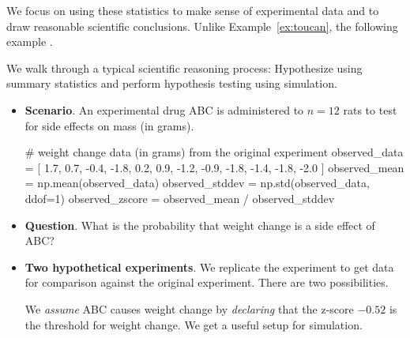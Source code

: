 \documentclass[../main.tex]{subfiles}
\begin{document}
\clearpage
We focus on using these statistics to make sense of experimental data and to draw reasonable scientific conclusions.  Unlike Example~\ref{ex:toucan}, the following example .

\begin{example} \label{ex:simulation}
  We walk through a typical scientific reasoning process: Hypothesize using summary statistics and perform hypothesis testing using simulation.

  \begin{itemize}[wide]
    \item \textbf{Scenario}. An experimental drug ABC is administered to \(n = 12\) rats to test for side effects on  mass (in grams).

      \begin{pythoncode}
# weight change data (in grams) from the original experiment
observed_data   = [
  1.7, 0.7, -0.4, -1.8, 0.2, 0.9, -1.2, -0.9, -1.8, -1.4, -1.8, -2.0
]
observed_mean   = np.mean(observed_data)
observed_stddev = np.std(observed_data, ddof=1)
observed_zscore = observed_mean / observed_stddev
      \end{pythoncode}

      \bigskip
      \begin{center}
        
      \end{center}


    \item \textbf{Question}. What is the probability that weight change is a side effect of ABC?

    \item \textbf{Two hypothetical experiments}. We replicate the experiment  to get data for comparison against the original experiment. There are two possibilities.

      \begin{center}
        

        
      \end{center}

      We \emph{assume} ABC causes weight change by \emph{declaring} that the z-score \(-0.52\) is the threshold for weight change.   We get a useful setup for simulation.


\end{itemize}
\end{example}
\end{document}

